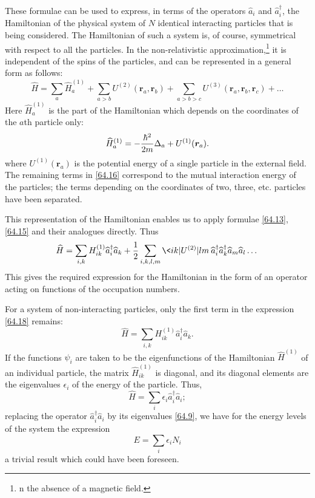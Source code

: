 These formulae can be used to express, in terms of the operators $\hat{a}_i$ and $\hat{a}_i^\dagger$, the Hamiltonian of the physical system of $ N $ identical interacting particles that is being considered. The Hamiltonian of such a system is, of course, symmetrical with respect to all the particles. In the non-relativistic approximation,\footnote{n the absence of a magnetic field.} it is independent of the spins of the particles, and can be represented in a general form as follows:
\begin{equation}\label{64.16}
\hat{H}=\sum_a\hat{H}_a^{(1)}+\sum_{a>b}U^{(2)}(\bm{r}_a,\bm{r}_b)+\sum_{a>b>c}U^{(3)}(\bm{r}_a,\bm{r}_b,\bm{r}_c)+\dots
\end{equation}
Here $ \hat{H}^{(1)}_a $ is the part of the Hamiltonian which depends on the coordinates of the $ a $th particle only:
\begin{equation}\label{64.17}
\widehat{H}_a^{(1)}=-\frac{\hbar^2}{2m}\Delta_a+U^{(1)}(\bm{r}_a).
\end{equation}
where $ U^{(1)}(\bm{r}_a) $ is the potential energy of a single particle in the external field. The remaining terms in \eqref{64.16} correspond to the mutual interaction energy of the particles; the terms depending on the coordinates of two, three, etc. particles have been separated.

This representation of the Hamiltonian enables us to apply formulae \eqref{64.13}, \eqref{64.15} and their analogues directly. Thus
\begin{equation}\label{64.18}
\hat{H}=\sum_{i,k}H_{ik}^{(1)}\hat{a}_i^\dagger\hat{a}_k+\frac{1}{2}\sum_{i,k,l,m}\< ik|U^{(2)}|lm\>\hat{a}_i^\dagger\hat{a}_k^\dagger\hat{a}_m\hat{a}_l\dots
\end{equation}
This gives the required expression for the Hamiltonian in the form of an operator acting on functions of the occupation numbers.

For a system of non-interacting particles, only the first term in the expression \eqref{64.18} remains:
\begin{equation}\label{64.19}
\hat{H}=\sum_{i,k}H_{ik}^{(1)}\hat{a}_i^\dagger\hat{a}_k.
\end{equation}
If the functions $\psi_i$ are taken to be the eigenfunctions of the Hamiltonian $ \hat{H}^{(1)} $ of an individual particle, the matrix $ \hat{H}^{(1)}_{ik} $ is diagonal, and its diagonal elements are the eigenvalues $ \epsilon_i $ of the energy of the particle. Thus,
\[ \hat{H}=\sum_i\epsilon_i\hat{a}_i^\dagger\hat{a}_i; \]
replacing the operator $ \hat{a}_i^\dagger\hat{a}_i $ by its eigenvalues \eqref{64.9}, we have for the energy levels of the system the expression
\[ E=\sum_i\epsilon_i N_i \]
a trivial result which could have been foreseen.

